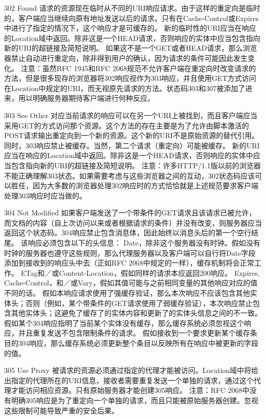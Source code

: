 302 Found
请求的资源现在临时从不同的URI响应请求。由于这样的重定向是临时的，客户端应当继续向原有地址发送以后的请求。只有在Cache-Control或Expires中进行了指定的情况下，这个响应才是可缓存的。
新的临时性的URI应当在响应的Location域中返回。除非这是一个HEAD请求，否则响应的实体中应当包含指向新的URI的超链接及简短说明。
如果这不是一个GET或者HEAD请求，那么浏览器禁止自动进行重定向，除非得到用户的确认，因为请求的条件可能因此发生变化。
注意：虽然RFC 1945和RFC 2068规范不允许客户端在重定向时改变请求的方法，但是很多现存的浏览器将302响应视作为303响应，并且使用GET方式访问在Location中规定的URI，而无视原先请求的方法。状态码303和307被添加了进来，用以明确服务器期待客户端进行何种反应。

303 See Other
对应当前请求的响应可以在另一个URI上被找到，而且客户端应当采用GET的方式访问那个资源。这个方法的存在主要是为了允许由脚本激活的POST请求输出重定向到一个新的资源。这个新的URI不是原始资源的替代引用。同时，303响应禁止被缓存。当然，第二个请求（重定向）可能被缓存。
新的URI应当在响应的Location域中返回。除非这是一个HEAD请求，否则响应的实体中应当包含指向新的URI的超链接及简短说明。
注意：许多HTTP/1.1版以前的浏览器不能正确理解303状态。如果需要考虑与这些浏览器之间的互动，302状态码应该可以胜任，因为大多数的浏览器处理302响应时的方式恰恰就是上述规范要求客户端处理303响应时应当做的。

304 Not Modified
如果客户端发送了一个带条件的GET请求且该请求已被允许，而文档的内容（自上次访问以来或者根据请求的条件）并没有改变，则服务器应当返回这个状态码。304响应禁止包含消息体，因此始终以消息头后的第一个空行结尾。
该响应必须包含以下的头信息：
Date，除非这个服务器没有时钟。假如没有时钟的服务器也遵守这些规则，那么代理服务器以及客户端可以自行将Date字段添加到接收到的响应头中去（正如RFC 2068中规定的一样），缓存机制将会正常工作。
ETag和／或Content-Location，假如同样的请求本应返回200响应。
Expires, Cache-Control，和／或Vary，假如其值可能与之前相同变量的其他响应对应的值不同的话。
假如本响应请求使用了强缓存验证，那么本次响应不应该包含其他实体头；否则（例如，某个带条件的GET请求使用了弱缓存验证），本次响应禁止包含其他实体头；这避免了缓存了的实体内容和更新了的实体头信息之间的不一致。
假如某个304响应指明了当前某个实体没有缓存，那么缓存系统必须忽视这个响应，并且重复发送不包含限制条件的请求。
假如接收到一个要求更新某个缓存条目的304响应，那么缓存系统必须更新整个条目以反映所有在响应中被更新的字段的值。

305 Use Proxy
被请求的资源必须通过指定的代理才能被访问。Location域中将给出指定的代理所在的URI信息，接收者需要重复发送一个单独的请求，通过这个代理才能访问相应资源。只有原始服务器才能创建305响应。
注意：RFC 2068中没有明确305响应是为了重定向一个单独的请求，而且只能被原始服务器创建。忽视这些限制可能导致严重的安全后果。

